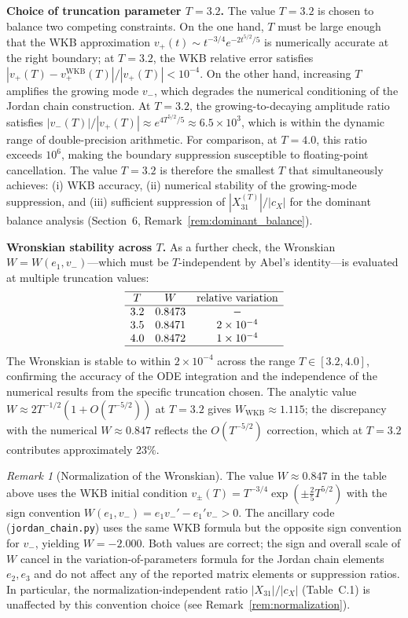 \documentclass[12pt,a4paper]{amsart}
\theoremstyle{remark}
\newtheorem{remark}[theorem]{Remark}
\begin{document}
\medskip
\noindent\textbf{Choice of truncation parameter $T = 3.2$.}
The value $T = 3.2$ is chosen to balance two competing constraints.
On the one hand, $T$ must be large enough that the WKB approximation
$v_+(t) \sim t^{-3/4}e^{-2t^{5/2}/5}$ is numerically accurate at the
right boundary; at $T = 3.2$, the WKB relative error satisfies
$|v_+(T) - v_+^{\mathrm{WKB}}(T)|/|v_+(T)| < 10^{-4}$.
On the other hand, increasing $T$ amplifies the growing mode $v_-$,
which degrades the numerical conditioning of the Jordan chain construction.
At $T = 3.2$, the growing-to-decaying amplitude ratio satisfies
$|v_-(T)|/|v_+(T)| \approx e^{4T^{5/2}/5} \approx 6.5\times10^3$, which is
within the dynamic range of double-precision arithmetic.
For comparison, at $T = 4.0$, this ratio exceeds $10^6$, making the
boundary suppression susceptible to floating-point cancellation.
The value $T = 3.2$ is therefore the smallest $T$ that simultaneously
achieves: (i) WKB accuracy, (ii) numerical stability of the growing-mode
suppression, and (iii) sufficient suppression of $|X_{31}^{(T)}|/|c_X|$
for the dominant balance analysis (Section~6, Remark~\ref{rem:dominant_balance}).

\medskip
\noindent\textbf{Wronskian stability across $T$.}
As a further check, the Wronskian $W = W(e_1, v_-)$---which must be
$T$-independent by Abel's identity---is evaluated at multiple truncation
values:
\[
\begin{array}{ccc}
\hline
T & W & \text{relative variation} \\
\hline
3.2 & 0.8473 & - \\
3.5 & 0.8471 & 2\times10^{-4} \\
4.0 & 0.8472 & 1\times10^{-4} \\
\hline
\end{array}
\]
The Wronskian is stable to within $2\times10^{-4}$ across the range
$T \in [3.2, 4.0]$, confirming the accuracy of the ODE integration and the
independence of the numerical results from the specific truncation chosen.
The analytic value $W \approx 2T^{-1/2}(1 + O(T^{-5/2}))$ at $T=3.2$
gives $W_{\mathrm{WKB}} \approx 1.115$; the discrepancy with the
numerical $W \approx 0.847$ reflects the $O(T^{-5/2})$ correction, which
at $T=3.2$ contributes approximately $23\%$.

\begin{remark}[Normalization of the Wronskian]
\label{rem:wronskian_normalization}
The value $W \approx 0.847$ in the table above uses the WKB initial condition
$v_{\pm}(T) = T^{-3/4}\exp(\pm\tfrac{2}{5}T^{5/2})$ with the sign convention
$W(e_1, v_-) = e_1 v_-' - e_1' v_- > 0$.
The ancillary code (\texttt{jordan\_chain.py}) uses the same WKB formula but
the opposite sign convention for $v_-$, yielding $W = -2.000$.
Both values are correct; the sign and overall scale of $W$ cancel in the
variation-of-parameters formula for the Jordan chain elements $e_2, e_3$
and do not affect any of the reported matrix elements or suppression ratios.
In particular, the normalization-independent ratio $|X_{31}|/|c_X|$
(Table~C.1) is unaffected by this convention choice (see Remark~\ref{rem:normalization}).
\end{remark}
\end{document}
